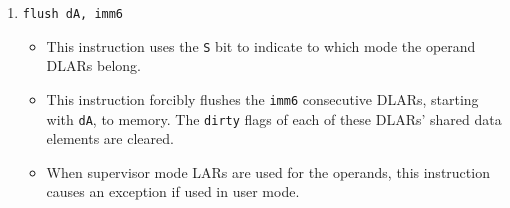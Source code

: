 \documentclass{article}
\begin{document}
\begin{itemize}
\begin{enumerate}
			\item \texttt{flush dA, imm6}
				\begin{itemize}
				\item This instruction uses the \texttt{S} bit to indicate
					to which mode the operand DLARs belong.
				\item This instruction forcibly flushes the \texttt{imm6}
					consecutive DLARs, starting with \texttt{dA}, to
					memory. The \texttt{dirty} flags of each of these
					DLARs' shared data elements are cleared.
				\item When supervisor mode LARs are used for the operands,
					this instruction causes an exception if used in user
					mode.
				\end{itemize}
			\end{enumerate}
		\end{itemize}
		\newpage
\end{document}
